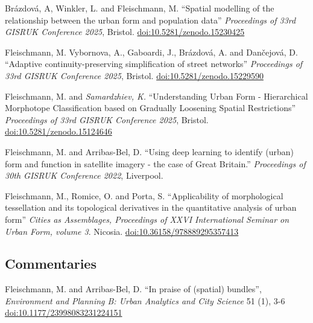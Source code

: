 \documentclass[12pt,a4paper]{report}
\begin{document}
    \begin{tablist}

        \item[2025] \tab{}Brázdová, A, Winkler, L. and Fleischmann, M. \enquote{Spatial modelling of the relationship between the urban form and population data} \textit{Proceedings of 33rd GISRUK Conference 2025}, Bristol. \href{https://doi.org/10.5281/zenodo.15230425}{doi:10.5281/zenodo.15230425}

        \item[2025] \tab{}Fleischmann, M. Vybornova, A., Gaboardi, J., Brázdová, A. and Dančejová, D. \enquote{Adaptive continuity-preserving simplification of street networks} \textit{Proceedings of 33rd GISRUK Conference 2025}, Bristol. \href{https://doi.org/10.5281/zenodo.15229590}{doi:10.5281/zenodo.15229590}

        \item[2025] \tab{}Fleischmann, M. and \textit{Samardzhiev, K.} \enquote{Understanding Urban Form - Hierarchical Morphotope Classification based on Gradually Loosening Spatial Restrictions} \textit{Proceedings of 33rd GISRUK Conference 2025}, Bristol. \href{https://doi.org/10.5281/zenodo.15124646}{doi:10.5281/zenodo.15124646}

        \item[2022] \tab{}Fleischmann, M. and Arribas-Bel, D. \enquote{Using deep learning to identify (urban) form and function in satellite imagery - the case of Great Britain.} \textit{Proceedings of 30th GISRUK Conference 2022}, Liverpool.

        \item[2022] \tab{}Fleischmann, M., Romice, O. and Porta, S. \enquote{Applicability of morphological tessellation and its topological derivatives in the quantitative analysis of urban form} \textit{Cities as Assemblages, Proceedings of XXVI International Seminar on Urban Form, volume 3}. Nicosia. \href{https://doi.org/10.36158/978889295357413}{doi:10.36158/978889295357413}

    \end{tablist}

    \subsection*{Commentaries}

    \begin{tablist}

        \item[2024] \tab{}Fleischmann, M. and Arribas-Bel, D. \enquote{In praise of (spatial) bundles}, \textit{Environment and Planning B: Urban Analytics and City Science} 51 (1), 3-6 \href{https://doi.org/10.1177/23998083231224151}{doi:10.1177/23998083231224151}

    \end{tablist}
\end{document}
